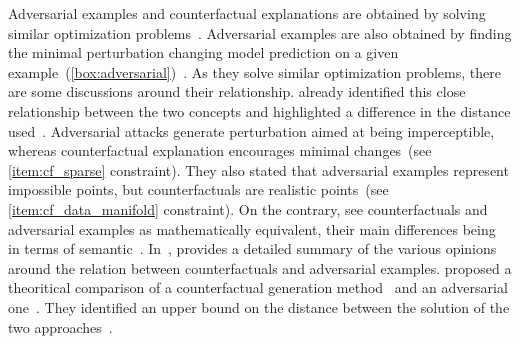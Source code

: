 \documentclass[../main.tex]{subfiles}
\begin{document}
	Adversarial examples and counterfactual explanations are obtained by solving similar optimization problems~\cite{Pawelczyk2021ExploringCE,Freiesleben2021}.
	Adversarial examples are also obtained by finding the minimal perturbation changing model prediction on a given example~(\cref{box:adversarial})~\cite{Szegedy2013IntriguingPO}.
	As they solve similar optimization problems, there are some discussions around their relationship.
	\citeauthor{wachter2017counterfactual} already identified this close relationship between the two concepts and highlighted a difference in the distance used~\cite{wachter2017counterfactual}.
	Adversarial attacks generate perturbation aimed at being imperceptible, whereas counterfactual explanation encourages minimal changes~(see \ref{item:cf_sparse} constraint).
	They also stated that adversarial examples represent impossible points, but counterfactuals are realistic points~(see \ref{item:cf_data_manifold} constraint).
	On the contrary, \citeauthor{browne2020} see counterfactuals and adversarial examples as mathematically equivalent, their main differences being in terms of semantic~\cite{browne2020}.
	In~\cite{Freiesleben2021}, \citeauthor{Freiesleben2021} provides a detailed summary of the various opinions around the relation between counterfactuals and adversarial examples.
	\citeauthor{Pawelczyk2021ExploringCE} proposed a theoritical comparison of a counterfactual generation method~\cite{wachter2017counterfactual} and an adversarial one~\cite{Carlini2016TowardsET}.
	They identified an upper bound on the distance between the solution of the two approaches~\cite{Pawelczyk2021ExploringCE}.
\end{document}
